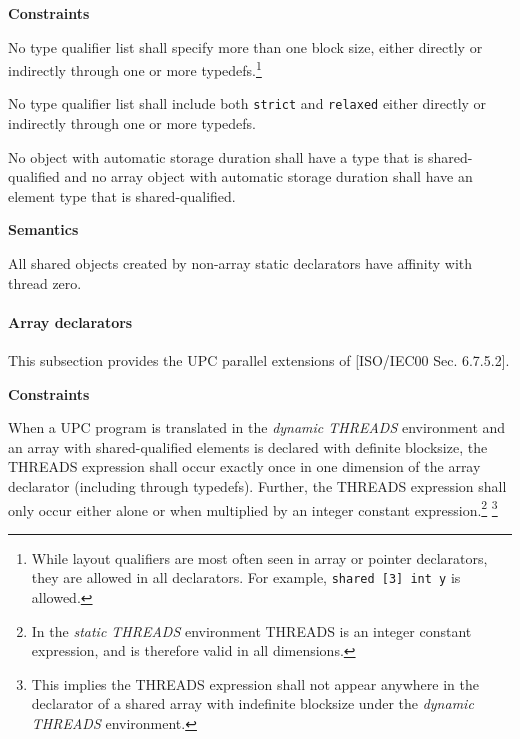 





\hspace{3em}{\em type-qualifier}

\hspace{3em}{\em type-qualifier-list type-qualifier}

{\bf Constraints} 

\np No type qualifier list shall specify more than one block
    size, either directly or indirectly through one or more
    typedefs.\footnote{While layout qualifiers are most often seen in
    array or pointer declarators, they are allowed in all declarators.  For
    example, {\tt shared [3] int y} is allowed.}

\np No type qualifier list shall include both {\tt strict}
    and {\tt relaxed} either directly or indirectly through one or
    more typedefs.

\np No object with automatic storage duration shall have a type
    that is shared-qualified and no array object with automatic
    storage duration shall have an element type that is shared-qualified.

{\bf Semantics} 

\np All shared objects created by non-array static declarators have
    affinity with thread zero.

\paragraph{Array declarators}
\label{shared_array}
\npf This subsection provides the UPC parallel extensions of
     [ISO/IEC00 Sec. 6.7.5.2].

{\bf Constraints} 

\np When a UPC program is translated in the {\em dynamic
    THREADS} environment and an array with shared-qualified elements
    is declared with definite blocksize, the THREADS expression shall
    occur exactly once in one dimension of the array declarator
    (including through typedefs).  Further, the THREADS expression
    shall only occur either alone or when multiplied by an integer
    constant expression.\footnote{In the {\em static THREADS} environment
    THREADS is an integer constant expression, and is therefore valid in
    all dimensions.} \footnote{This implies the THREADS expression
    shall not appear anywhere in the declarator of a shared array with
    indefinite blocksize under the {\em dynamic THREADS} environment.}


